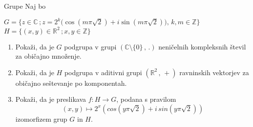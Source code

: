 \begin{frame}{Grupe}
	Naj bo

	$G = \{ z \in \mathbb{C} \,; z = 2^k \big(\cos(m \pi \sqrt{2}) + i \sin(m \pi \sqrt{2})\big), \, k, m \in \mathbb{Z} \}$
	$H = \{ (x, y) \in \mathbb{R}^2  \,; x, y \in \mathbb{Z} \}$

	\begin{enumerate}
		\item
			Pokaži, da je $G$ podgrupa v grupi $(\mathbb{C}\setminus{\{0\}}\, , \, .)$
			neničelnih kompleksnih števil za običajno množenje.
		\item
			Pokaži, da je $H$ podgrupa v aditivni grupi $(\mathbb{R}^2\, , \, +)$
			ravninskih vektorjev za običajno seštevanje po komponentah.
		\item
			Pokaži, da je preslikava $f:H\to G$, podana s pravilom
			$$(x,y)\mapsto2^x(cos(y\pi\sqrt{2})+i\, sin(y\pi \sqrt{2}))$$
			izomorfizem grup $G$ in $H$.
	\end{enumerate}
\end{frame}
